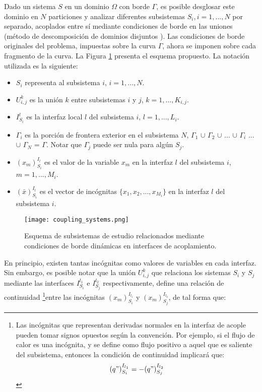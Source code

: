 Dado un sistema $S$ en un dominio $\Omega$ con borde $\Gamma$, es posible desglosar este dominio en $N$ particiones 
y analizar diferentes subsistemas $S_i,i=1,...,N$ por separado, acoplados entre sí mediante condiciones de borde en las uniones
(método de descomposición de dominios disjuntos \cite{ddmethod}).
Las condiciones de borde originales del problema, impuestas sobre la curva $\Gamma$,
ahora se imponen sobre cada fragmento de la curva.
La Figura \ref{esquema-acoplamiento} presenta el esquema propuesto.
La notación utilizada es la siguiente:
\begin{itemize}
\item $S_i$ representa al subsistema $i$, $i=1,...,N$.
\item $U_{i,j}^k$ es la unión $k$ entre subsistemas $i$ y $j$, $k=1,...,K_{i,j}$.
\item $I_{S_i}^{l}$ es la interfaz local $l$ del subsistema $i$, $l=1,...,L_i$.
\item $\Gamma_i$ es la porción de frontera exterior en el subsistema $N$,
 $\Gamma_1$ $\cup$ $\Gamma_2$ $\cup$ ... $\cup$ $\Gamma_i$ ...  $\cup$ $\Gamma_N$ = $\Gamma$.
 Notar que $\Gamma_j$ puede ser nula para algún $S_j$.
\item ${(x_m)_{S_i}^{I_l}}$ es el valor de la variable $x_m$ en la interfaz ${l}$ del subsistema ${i}$, $m=1,...,M_i$.
\item ${(\bar{x})_{S_i}^{I_l}}$ es el vector de incógnitas $\{x_1,x_2,...,x_{M_i}\}$ en la interfaz ${l}$ del subsistema ${i}$.
\end{itemize}

\begin{figure}['ht]
\centering{}\texttt{[image: coupling\_systems.png]}
\caption[Esquema de descomposición en dominios disjuntos]{Esquema de subsistemas de estudio relacionados mediante condiciones de borde dinámicas en interfaces de acoplamiento.} 
\label{esquema-acoplamiento} 
\end{figure}

En principio, existen tantas incógnitas como valores de variables en cada interfaz.
Sin embargo, es posible notar que la unión $U_{i,j}^k$ que relaciona los sistemas $S_{i}$ y $S_{j}$ 
mediante las interfaces $I_{S_{i}}^{l_1}$ e $I_{S_{j}}^{l_2}$ respectivamente, 
define una relación de continuidad
\footnote{
Las incógnitas que representan derivadas normales en la interfaz de acople pueden tomar signos opuestos según la convención.
Por ejemplo, si el flujo de calor es una incógnita, 
y se define como flujo positivo a aquel que es saliente del subsistema, 
entonces la condición de continuidad implicará que:
\begin{equation*}
{(q")_{S_i}^{I_{l_1}}}=-{(q")_{S_j}^{I_{l_2}}}
\label{continuidad-q}
\end{equation*}
}entre las incógnitas ${(x_m)_{S_i}^{I_{l_1}}}$ y ${(x_m)_{S_j}^{I_{l_2}}}$, de tal forma que:

